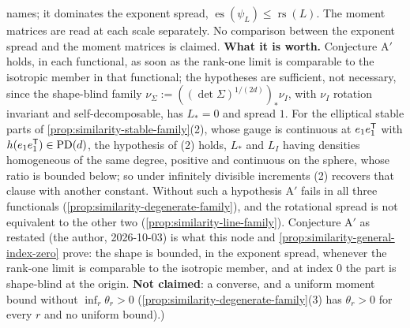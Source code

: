 \begin{proposition}
{names; it dominates the exponent spread, $\operatorname{es}(\psi_L) \le \operatorname{rs}(L)$. The moment
matrices are read at each scale separately. No comparison between the exponent spread and the moment
matrices is claimed.
\textbf{What it is worth.} Conjecture A$'$ holds, in each functional, as soon as the rank-one limit is
comparable to the isotropic member in that functional; the hypotheses are sufficient, not necessary,
since the shape-blind family $\nu_\Sigma := ((\det\Sigma)^{1/(2d)})_*\nu_I$, with $\nu_I$ rotation invariant and
self-decomposable, has $L_* = 0$ and spread $1$. For the elliptical stable parts of
\ref{prop:similarity-stable-family}(2), whose gauge is continuous at $e_1e_1^{\mathsf{T}}$ with
$h(e_1e_1^{\mathsf{T}}) \in \mathrm{PD}(d)$, the hypothesis of (2) holds, $L_*$ and $L_I$ having densities homogeneous of
the same degree, positive and continuous on the sphere, whose ratio is bounded below; so under
infinitely divisible increments (2) recovers that clause with another constant. Without such a
hypothesis A$'$ fails in all three functionals (\ref{prop:similarity-degenerate-family}), and the
rotational spread is not equivalent to the other two (\ref{prop:similarity-line-family}). Conjecture
A$'$ as restated (the author, 2026-10-03) is what this node and \ref{prop:similarity-general-index-zero}
prove: the shape is bounded, in the exponent spread, whenever the rank-one limit is comparable to the
isotropic member, and at index $0$ the part is shape-blind at the origin. \textbf{Not claimed}: a converse, and a uniform moment
bound without $\inf_r\theta_r > 0$ (\ref{prop:similarity-degenerate-family}(3) has $\theta_r > 0$ for every
$r$ and no uniform bound).)}
\end{proposition}

